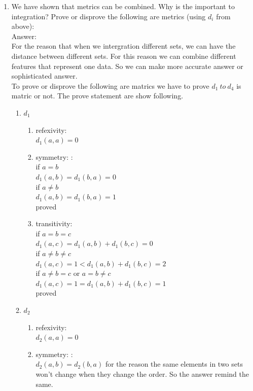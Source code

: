 \documentclass{article}
\begin{document}
\begin{enumerate}
\item We have shown that metrics can be combined.  Why is the important to integration? Prove or disprove the following are metrics (using $d_i$ from above):\\
Answer:\\
For the reason that when we intergration different sets, we can have the distance between different sets. For this reason we can combine different features that represent one data. So we can make more accurate answer or sophisticated answer.\\
To prove or disprove the following are matrics we have to prove $d_1\ to\ d_4$ is matric or not. The prove statement are show following.
\begin{enumerate}
	\item $d_1$
	\begin{enumerate}
		\item refexivity:\\
		$d_1(a,a) = 0$\\
		\item symmetry: :\\
		if $a = b$\\
		$d_1(a, b) = d_1(b, a) = 0$\\
		if $a \neq b$\\
		$d_1(a,b) = d_1(b,a ) = 1$\\
		proved\\
		\item transitivity:\\
		if $a = b = c$ \\
		$d_1(a,c) = d_1(a,b) + d_1(b, c) = 0$\\
		if $a \neq b \neq c$\\
		$d_1(a,c) = 1 < d_1(a,b) + d_1(b, c) = 2$\\
		if $a \neq b = c$ or $a = b \neq c$ \\
		$d_1(a,c) = 1 = d_1(a,b) + d_1(b, c) = 1$\\
		proved
	\end{enumerate}
	\item $d_2$
	\begin{enumerate}
		\item refexivity:\\
		$d_2(a,a) = 0$\\
		\item symmetry: :\\
		$d_2(a,b) = d_2(b,a)$ for the reason the same elements in two sets won't change when they change the order. So the answer remind the same.\\

\end{enumerate}
\end{enumerate}
\end{enumerate}
\end{document}
